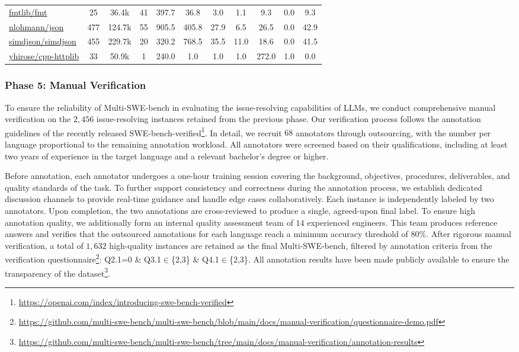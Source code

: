 \documentclass[11pt, a4paper, logo, copyright, nonumbering]{seed}
\newcommand{\multiswebench}{Multi-SWE-bench\xspace}
\begin{document}
\begin{table}[!ht]
{\begin{tabular}{lcc|c|c|ccc|ccc}
\href{https://github.com/fmtlib/fmt}{fmtlib/fmt} & 25 & 36.4k & 41 & 397.7 & 36.8 & 3.0 & 1.1 & 9.3 & 0.0 & 9.3 \\ 
\href{https://github.com/nlohmann/json}{nlohmann/json} & 477 & 124.7k & 55 & 905.5 & 405.8 & 27.9 & 6.5 & 26.5 & 0.0 & 42.9 \\ 
\href{https://github.com/simdjson/simdjson}{simdjson/simdjson} & 455 & 229.7k & 20 & 320.2 & 768.5 & 35.5 & 11.0 & 18.6 & 0.0 & 41.5 \\ 
\href{https://github.com/yhirose/cpp-httplib}{yhirose/cpp-httplib} & 33 & 50.9k & 1 & 240.0 & 1.0 & 1.0 & 1.0 & 272.0 & 1.0 & 0.0 \\ 
    \bottomrule
    \end{tabular}}
    \label{tab:repo_stat}
\end{table}


\subsubsection{Phase 5: Manual Verification}
\label{sec:phase5_manual_verification}
To ensure the reliability of \multiswebench in evaluating the issue-resolving capabilities of LLMs, we conduct comprehensive manual verification on the $2,456$ issue-resolving instances retained from the previous phase.
Our verification process follows the annotation guidelines of the recently released SWE-bench-verified\footnote{\url{https://openai.com/index/introducing-swe-bench-verified}}.
In detail, we recruit $68$ annotators through outsourcing, with the number per language proportional to the remaining annotation workload.
All annotators were screened based on their qualifications, including at least two years of experience in the target language and a relevant bachelor's degree or higher.

Before annotation, each annotator undergoes a one-hour training session covering the background, objectives, procedures, deliverables, and quality standards of the task.
To further support consistency and correctness during the annotation process, we establish dedicated discussion channels to provide real-time guidance and handle edge cases collaboratively.
Each instance is independently labeled by two annotators. 
Upon completion, the two annotations are cross-reviewed to produce a single, agreed-upon final label.
To ensure high annotation quality, we additionally form an internal quality assessment team of $14$ experienced engineers.
This team produces reference answers and verifies that the outsourced annotations for each language reach a minimum accuracy threshold of $80\%$.
% 
After rigorous manual verification, a total of $1,632$ high-quality instances are retained as the final \multiswebench, filtered by annotation criteria from the verification questionnaire\footnote{\url{https://github.com/multi-swe-bench/multi-swe-bench/blob/main/docs/manual-verification/questionnaire-demo.pdf}}: Q2.1=0 \& Q3.1$\in$\{2,3\} \& Q4.1$\in$\{2,3\}.
All annotation results have been made publicly available to ensure the transparency of the dataset\footnote{\url{https://github.com/multi-swe-bench/multi-swe-bench/tree/main/docs/manual-verification/annotation-results}}.
\end{document}
